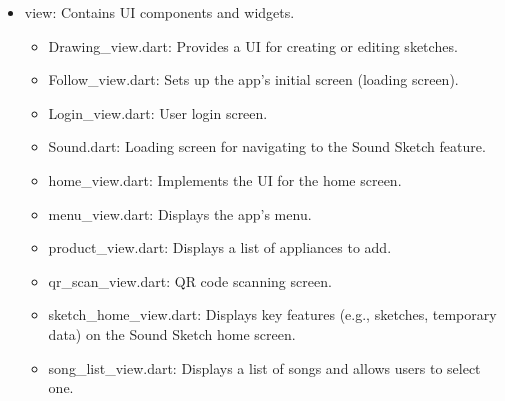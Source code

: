 \documentclass[conference]{IEEEtran}
\begin{document}
\begin{itemize}
\begin{itemize}
\item view: Contains UI components and widgets.
\begin{itemize}
    \item Drawing\_view.dart: Provides a UI for creating or editing sketches. \\
    \item Follow\_view.dart: Sets up the app's initial screen (loading screen). \\
    \item Login\_view.dart: User login screen. \\
    \item Sound.dart: Loading screen for navigating to the Sound Sketch feature. \\
    \item home\_view.dart: Implements the UI for the home screen. \\
    \item menu\_view.dart: Displays the app's menu. \\
    \item product\_view.dart: Displays a list of appliances to add. \\
    \item qr\_scan\_view.dart: QR code scanning screen. \\
    \item sketch\_home\_view.dart: Displays key features (e.g., sketches, temporary data) on the Sound Sketch home screen. \\
    \item song\_list\_view.dart: Displays a list of songs and allows users to select one. \\
\end{itemize}


\end{itemize}
\end{itemize}
\end{document}
